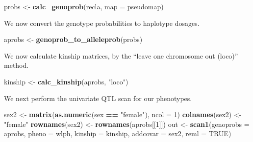\documentclass{book}
\newenvironment{Shaded}{\begin{snugshade}}{\end{snugshade}}
\newcommand{\CommentTok}[1]{\textcolor[rgb]{0.56,0.35,0.01}{\textit{#1}}}
\newcommand{\DataTypeTok}[1]{\textcolor[rgb]{0.13,0.29,0.53}{#1}}
\newcommand{\DecValTok}[1]{\textcolor[rgb]{0.00,0.00,0.81}{#1}}
\newcommand{\KeywordTok}[1]{\textcolor[rgb]{0.13,0.29,0.53}{\textbf{#1}}}
\newcommand{\NormalTok}[1]{#1}
\newcommand{\OperatorTok}[1]{\textcolor[rgb]{0.81,0.36,0.00}{\textbf{#1}}}
\newcommand{\OtherTok}[1]{\textcolor[rgb]{0.56,0.35,0.01}{#1}}
\newcommand{\StringTok}[1]{\textcolor[rgb]{0.31,0.60,0.02}{#1}}
\begin{document}
\begin{Shaded}
\begin{Highlighting}[]
\NormalTok{probs <-}\StringTok{ }\KeywordTok{calc_genoprob}\NormalTok{(recla, }\DataTypeTok{map =}\NormalTok{ pseudomap)}
\end{Highlighting}
\end{Shaded}

We now convert the genotype probabilities to haplotype dosages.

\begin{Shaded}
\begin{Highlighting}[]
\NormalTok{aprobs <-}\StringTok{ }\KeywordTok{genoprob_to_alleleprob}\NormalTok{(probs)}
\end{Highlighting}
\end{Shaded}

We now calculate kinship matrices, by the ``leave one chromosome out
(loco)'' method.

\begin{Shaded}
\begin{Highlighting}[]
\NormalTok{kinship <-}\StringTok{ }\KeywordTok{calc_kinship}\NormalTok{(aprobs, }\StringTok{"loco"}\NormalTok{)}
\end{Highlighting}
\end{Shaded}

\begin{Shaded}
\end{Shaded}

We next perform the univariate QTL scan for our phenotypes.

\begin{Shaded}
\begin{Highlighting}[]
\NormalTok{sex2 <-}\StringTok{ }\KeywordTok{matrix}\NormalTok{(}\KeywordTok{as.numeric}\NormalTok{(sex }\OperatorTok{==}\StringTok{ "female"}\NormalTok{), }\DataTypeTok{ncol =} \DecValTok{1}\NormalTok{)}
\KeywordTok{colnames}\NormalTok{(sex2) <-}\StringTok{ "female"}
\KeywordTok{rownames}\NormalTok{(sex2) <-}\StringTok{ }\KeywordTok{rownames}\NormalTok{(aprobs[[}\DecValTok{1}\NormalTok{]])}
\NormalTok{out <-}\StringTok{ }\KeywordTok{scan1}\NormalTok{(}\DataTypeTok{genoprobs =}\NormalTok{ aprobs, }\DataTypeTok{pheno =}\NormalTok{ wlph, }\DataTypeTok{kinship =}\NormalTok{ kinship, }\DataTypeTok{addcovar =}\NormalTok{ sex2, }\DataTypeTok{reml =} \OtherTok{TRUE}\NormalTok{)}
\end{Highlighting}
\end{Shaded}
\end{document}
